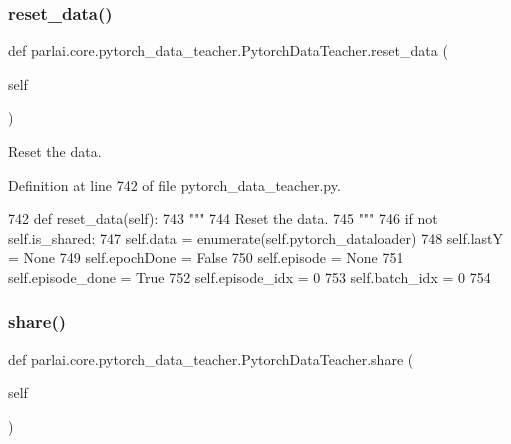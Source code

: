 \subsubsection{\texorpdfstring{reset\+\_\+data()}{reset\_data()}}
{\footnotesize\ttfamily def parlai.\+core.\+pytorch\+\_\+data\+\_\+teacher.\+Pytorch\+Data\+Teacher.\+reset\+\_\+data (\begin{DoxyParamCaption}\item[{}]{self }\end{DoxyParamCaption})}

\begin{DoxyVerb}Reset the data.
\end{DoxyVerb}
 

Definition at line 742 of file pytorch\+\_\+data\+\_\+teacher.\+py.


\begin{DoxyCode}
742     \textcolor{keyword}{def }reset\_data(self):
743         \textcolor{stringliteral}{"""}
744 \textcolor{stringliteral}{        Reset the data.}
745 \textcolor{stringliteral}{        """}
746         \textcolor{keywordflow}{if} \textcolor{keywordflow}{not} self.is\_shared:
747             self.data = enumerate(self.pytorch\_dataloader)
748         self.lastY = \textcolor{keywordtype}{None}
749         self.epochDone = \textcolor{keyword}{False}
750         self.episode = \textcolor{keywordtype}{None}
751         self.episode\_done = \textcolor{keyword}{True}
752         self.episode\_idx = 0
753         self.batch\_idx = 0
754 
\end{DoxyCode}
\mbox{\label{classparlai_1_1core_1_1pytorch__data__teacher_1_1PytorchDataTeacher_a519a6be3f88b650d0325402b0c4b80ce}} 
\subsubsection{\texorpdfstring{share()}{share()}}
{\footnotesize\ttfamily def parlai.\+core.\+pytorch\+\_\+data\+\_\+teacher.\+Pytorch\+Data\+Teacher.\+share (\begin{DoxyParamCaption}\item[{}]{self }\end{DoxyParamCaption})}

